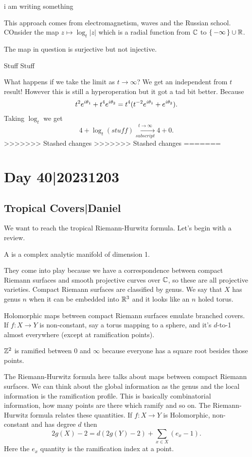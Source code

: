 \documentclass[12pt]{memoir}
\begin{document}
i am writing something


This approach comes from electromagnetism, waves and the Russian school. COnsider the map $z\mapsto\log_t|z|$ which is a radial function from $\mathbb{C}$ to $\{\,-\infty\,\}\cup\mathbb{R}$.\par 
The map in question is surjective but not injective.\par 
Stuff Stuff\par 
What happens if we take the limit as $t\to\infty$? We get an independent from $t$ result! However this is still a hyperoperation but it got a tad bit better. Because 
$$t^2e^{i\theta_1}+t^4e^{i\theta_2}=t^4(t^{-2}e^{i\theta_1}+e^{i\theta_2}).$$
Taking $\log_t$ we get 
$$4+\log_t(stuff)\xrightarrow[subscript]{t\to\infty}4+0.$$ 
>>>>>>> Stashed changes
>>>>>>> Stashed changes
=======
\section{Day 40|20231203}

\subsection{Tropical Covers|Daniel}

We want to reach the tropical Riemann-Hurwitz formula. Let's begin with a review.

\begin{Def}
    A  is a complex analytic manifold of dimension 1.
\end{Def}

They come into play because we have a correspondence between compact Riemann surfaces and smooth projective curves over $\mathbb{C}$, so these are all projective varieties. Compact Riemann surfaces are classified by genus. We say that $X$ has genus $n$ when it can be embedded into $\mathbb{R}^3$ and it looks like an $n$ holed torus.\par 
Holomorphic maps between compact Riemann surfaces emulate branched covers. If $f:X\to Y$ is non-constant, say a torus mapping to a sphere, and it's $d$-to-1 almost everywhere (except at ramification points).

\begin{Ex}
    $\mathbb{Z}^2$ is ramified between $0$ and $\infty$ because everyone has a square root besides those points.
\end{Ex}

The Riemann-Hurwitz formula here talks about maps between compact Riemann surfaces. We can think about the global information as the genus and the local information is the ramification profile. This is basically combinatorial information, how many points are there which ramify and so on. The Riemann-Hurwitz formula relates these quantities. If $f: X\to Y$ is Holomorphic, non-constant and has degree $d$ then 
$$2g(X)-2=d(2g(Y)-2)+\sum_{x\in X} (e_x-1).$$
Here the $e_x$ quantity is the ramification index at a point. 
\end{document}
